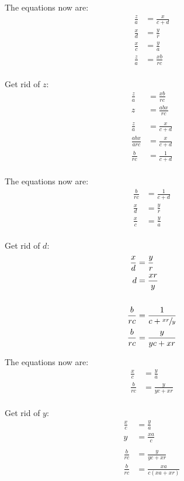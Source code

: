 \documentclass{exam}
\begin{document}
\begin{description}
      The equations now are:
      \begin{align*}
        \frac{z}{a} & = \frac{x}{c + d} \\
        \frac{x}{d} & = \frac{y}{r} \\
        \frac{x}{c} & = \frac{y}{a} \\
        \frac{z}{a} & = \frac{xb}{rc} \\
      \end{align*}

      Get rid of $z$:
      \begin{align*}
        \frac{z}{a}     & = \frac{xb}{rc} \\
        z               & = \frac{abx}{rc} \\
        \\
        \frac{z}{a}     & = \frac{x}{c + d} \\
        \frac{abx}{arc} & = \frac{x}{c + d} \\
        \frac{b}{rc}    & = \frac{1}{c + d} \\
      \end{align*}

      The equations now are:
      \begin{align*}
        \frac{b}{rc} & = \frac{1}{c + d} \\
        \frac{x}{d}  & = \frac{y}{r} \\
        \frac{x}{c}  & = \frac{y}{a} \\
      \end{align*}

      Get rid of $d$:
      \begin{align*}
        \frac{x}{d}  & = \frac{y}{r} \\
        d            & = \frac{xr}{y} \\
        \\
        \frac{b}{rc} & = \frac{1}{c + \sfrac{xr}{y}} \\
        \frac{b}{rc} & = \frac{y}{yc + xr} \\
      \end{align*}

      The equations now are:
      \begin{align*}
        \frac{x}{c}  & = \frac{y}{a} \\
        \frac{b}{rc} & = \frac{y}{yc + xr} \\
      \end{align*}

      Get rid of $y$:
      \begin{align*}
        \frac{x}{c}  & = \frac{y}{a} \\
        y            & = \frac{xa}{c} \\
        \\
        \frac{b}{rc} & = \frac{y}{yc + xr} \\
        \frac{b}{rc} & = \frac{xa}{c(xa + xr)} \\
      \end{align*}


\end{description}
\end{document}
